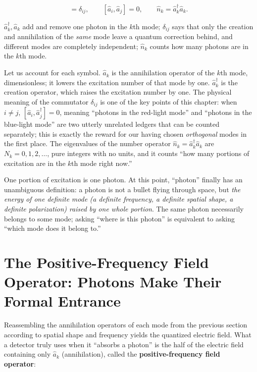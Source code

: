 \begin{equation}
  [\hat a_i,\hat a_j^\dagger]=\delta_{ij},\qquad
  [\hat a_i,\hat a_j]=0,\qquad
  \hat n_k=\hat a_k^\dagger\hat a_k .
  \label{eq:e05-commutator}
\end{equation}
\begin{formulaexplain}
\(\hat a_k^\dagger,\hat a_k\) add and remove one photon in the \(k\)th mode; \(\delta_{ij}\) says that only the creation and annihilation of the \emph{same} mode leave a quantum correction behind, and different modes are completely independent; \(\hat n_k\) counts how many photons are in the \(k\)th mode.
\end{formulaexplain}

Let us account for each symbol. \(\hat a_k\) is the annihilation operator of the \(k\)th mode, dimensionless; it lowers the excitation number of that mode by one. \(\hat a_k^\dagger\) is the creation operator, which raises the excitation number by one. The physical meaning of the commutator \(\delta_{ij}\) is one of the key points of this chapter: when \(i\neq j\), \([\hat a_i,\hat a_j^\dagger]=0\), meaning ``photons in the red-light mode'' and ``photons in the blue-light mode'' are two utterly unrelated ledgers that can be counted separately; this is exactly the reward for our having chosen \emph{orthogonal} modes in the first place. The eigenvalues of the number operator \(\hat n_k=\hat a_k^\dagger\hat a_k\) are \(N_k=0,1,2,\dots\), pure integers with no units, and it counts ``how many portions of excitation are in the \(k\)th mode right now.''

One portion of excitation is one photon. At this point, ``photon'' finally has an unambiguous definition: a photon is not a bullet flying through space, but \emph{the energy of one definite mode (a definite frequency, a definite spatial shape, a definite polarization) raised by one whole portion}. The same photon necessarily belongs to some mode; asking ``where is this photon'' is equivalent to asking ``which mode does it belong to.''

\section{The Positive-Frequency Field Operator: Photons Make Their Formal Entrance}
\label{sec:e05-field-operator}

Reassembling the annihilation operators of each mode from the previous section according to spatial shape and frequency yields the quantized electric field. What a detector truly uses when it ``absorbs a photon'' is the half of the electric field containing only \(\hat a_k\) (annihilation), called the \textbf{positive-frequency field operator}:

